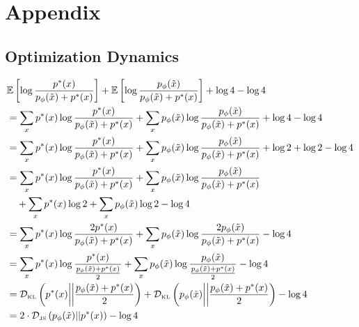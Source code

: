 \section{Appendix}


\subsection{Optimization Dynamics}
\label{sec:proof-for-jsd-thing}
\begin{small}
  \begin{align}
    & \mathbb{E}\left[\log{{\ptx \over \pgx + \ptx}}\right] + \mathbb{E}\left[\log{\pgx\over\pgx + \ptx}\right] + \log4 - \log4 \\
    & = \sum_{x}\ptx\log{\ptx \over \pgx + \ptx} + \sum_{x}\pgx\log{\pgx \over \pgx + \ptx} + \log4 - \log4 \\
    & = \sum_{x}\ptx\log{\ptx \over \pgx + \ptx} + \sum_{x}\pgx\log{\pgx \over \pgx + \ptx} + \log2 + \log2 - \log4 \\
    & = \sum_{x}\ptx\log{\ptx \over \pgx + \ptx} + \sum_{x}\pgx\log{\pgx
      \over \pgx + \ptx} \\
    & \quad + \sum_{x}\ptx\log2 + \sum_{x}\pgx\log2 - \log4 \\
    & = \sum_{x}\ptx\log{2\ptx \over \pgx + \ptx} + \sum_{x}\pgx\log{2\pgx \over \pgx + \ptx} - \log4 \\
    & = \sum_{x}\ptx\log{\ptx \over {\pgx + \ptx \over 2}} + \sum_{x}\pgx\log{\pgx \over {\pgx + \ptx \over 2}} - \log4 \\
    & = \KL{\ptx}{\pgx + \ptx \over 2} + \KL{\pgx}{\pgx+\ptx \over 2} - \log4 \\
    & = 2 \cdot \JSD{\pgx}{\ptx} - \log4
  \end{align}
\end{small}

